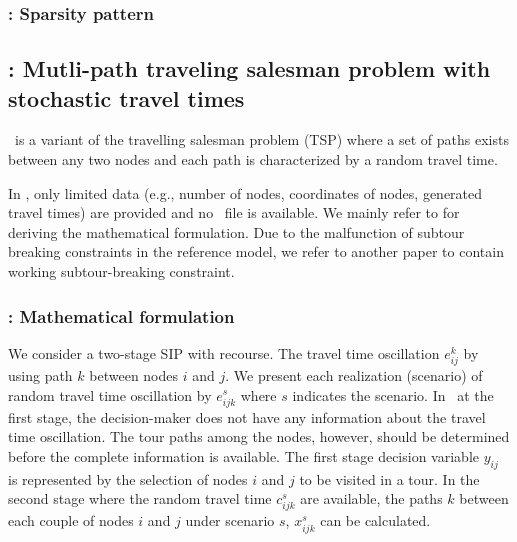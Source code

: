 \subsubsection{\dcap: Sparsity pattern}


%
%


\subsection{\mptsps: Mutli-path traveling salesman problem with stochastic travel times} \label{MPTSPs}
\mptsps\ is a variant of the travelling salesman problem (TSP) where a set of paths exists between any two nodes and each path is characterized by a random travel time. 

In \siplib, only limited data (e.g., number of nodes, coordinates of nodes, generated travel times) are provided and no \smps\ file is available. We mainly refer to \cite{journal:PGM2017} for deriving the mathematical formulation. Due to the malfunction of subtour breaking constraints in the reference model, we refer to another paper \cite{journal:LSD1990} to contain working subtour-breaking constraint. %
\subsubsection{\mptsps: Mathematical formulation}
We consider a two-stage SIP with recourse. The travel time oscillation $e_{ij}^k$ by using path $k$ between nodes $i$ and $j$. We present each realization (scenario) of random travel time oscillation by $e_{ijk}^{s}$ where $s$ indicates the scenario. In \mptsps\, at the first stage, the decision-maker does not have any information about the travel time oscillation. The tour paths among the nodes, however, should be determined before the complete information is available. The first stage decision variable $y_{ij}$ is represented by the selection of nodes $i$ and $j$ to be visited in a tour. In the second stage where the random travel time $c_{ijk}^{s}$ are available, the paths $k$ between each couple of nodes $i$ and $j$ under scenario $s$, $x_{ijk}^{s}$ can be calculated. 


